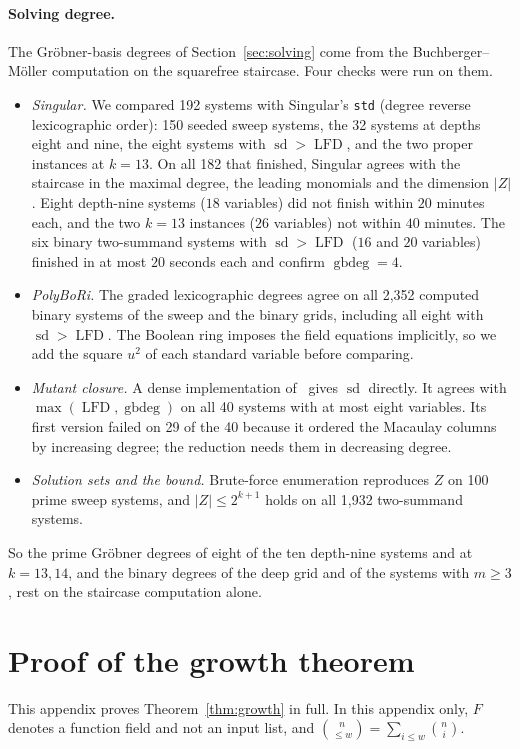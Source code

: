 \documentclass[11pt]{article}
\theoremstyle{definition}\newtheorem{definition}[theorem]{Definition}
\theoremstyle{remark}\newtheorem{remark}[theorem]{Remark}
\newcommand{\lfd}{\operatorname{LFD}}
\newcommand{\sd}{\operatorname{sd}}
\newcommand{\gbdeg}{\operatorname{gbdeg}}
\begin{document}
\paragraph{Solving degree.} The Gr\"obner-basis degrees of
Section~\ref{sec:solving} come from the Buchberger--M\"oller computation on
the squarefree staircase. Four checks were run on them.
\begin{itemize}
\item \emph{Singular.} We compared 192 systems with Singular's \texttt{std}
 (degree reverse lexicographic order): 150 seeded sweep systems, the 32
 systems at depths eight and nine, the eight systems with $\sd>\lfd$, and the
 two proper instances at $k=13$. On all 182 that finished, Singular agrees
 with the staircase in the maximal degree, the leading monomials and the
 dimension $|Z|$. Eight depth-nine systems ($18$ variables) did not finish
 within $20$ minutes each, and the two $k=13$ instances ($26$ variables) not
 within $40$ minutes. The six binary two-summand systems with $\sd>\lfd$
 ($16$ and $20$ variables) finished in at most $20$ seconds each and
 confirm $\gbdeg=4$.
\item \emph{PolyBoRi.} The graded lexicographic degrees agree on all 2{,}352
 computed binary systems of the sweep and the binary grids, including all eight with $\sd>\lfd$. The Boolean
 ring imposes the field equations implicitly, so we add the square $u^2$ of
 each standard variable before comparing.
\item \emph{Mutant closure.} A dense implementation of~\cite[Def.~1.1]{cg} gives $\sd$ directly. It agrees with
 $\max(\lfd,\gbdeg)$ on all 40 systems with at most eight variables. Its
 first version failed on 29 of the 40 because it ordered the Macaulay
 columns by increasing degree; the reduction needs them in decreasing
 degree.
\item \emph{Solution sets and the bound.} Brute-force enumeration
 reproduces $Z$ on 100 prime sweep systems, and $|Z|\le2^{k+1}$ holds on all
 1{,}932 two-summand systems.
\end{itemize}
So the prime Gr\"obner degrees of eight of the ten depth-nine systems and
at $k=13,14$, and the binary degrees of the deep grid and of the systems
with $m\ge3$, rest on the staircase computation alone.

\section{Proof of the growth theorem}\label{app:growthproof}
This appendix proves Theorem~\ref{thm:growth} in full. In this appendix
only, $F$ denotes a function field and not an input list, and
$\binom{n}{\le w}=\sum_{i\le w}\binom ni$.
\end{document}
